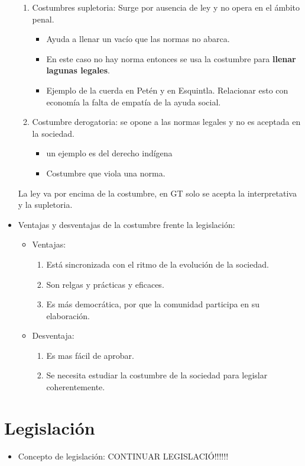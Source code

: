 \begin{itemize}
\begin{enumerate}
            \item Costumbres supletoria: Surge por ausencia de ley y no opera en el ámbito penal.
                \begin{itemize}
                    \item Ayuda a llenar un vacío que las normas no abarca.
                    \item En este caso no hay norma entonces se usa la costumbre para \textbf{llenar lagunas legales}.
                    \item Ejemplo de la cuerda en Petén y en Esquintla. Relacionar esto con economía la falta de empatía de la ayuda social.
                \end{itemize} %
            
            \item Costumbre derogatoria: se opone a las normas legales y no es aceptada en la sociedad.
                \begin{itemize}
                    \item un ejemplo es del derecho indígena 
                    \item Costumbre que viola una norma.
                \end{itemize}
        \end{enumerate}
    La ley va por encima de la costumbre, en GT solo se acepta la interpretativa y la supletoria.
    
    \item Ventajas y desventajas de la costumbre frente la legislación:
        \begin{itemize}
            \item Ventajas:
                \begin{enumerate}
                    \item Está sincronizada con el ritmo de la evolución de la sociedad.
                    \item Son relgas y prácticas y eficaces.
                    \item Es más democrática, por que la comunidad participa en su elaboración.
                \end{enumerate}
            
            \item Desventaja:
                \begin{enumerate}
                    \item Es mas fácil de aprobar.
                    \item Se necesita estudiar la costumbre de la sociedad para legislar coherentemente.
                \end{enumerate} %
        \end{itemize}
\end{itemize}

\section{Legislación}
\begin{itemize}
    \item Concepto de legislación:  CONTINUAR LEGISLACIÓ!!!!!!
\end{itemize}
